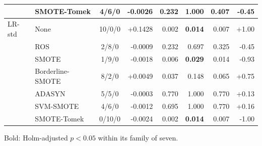\documentclass[10pt,a4paper]{article}
\begin{document}
\begin{center}
\begin{longtable}{@{}llcrrrrr@{}}
 & SMOTE-Tomek & 4/6/0 & -0.0026 & 0.232 & 1.000 & 0.407 & -0.45 \\
\midrule
LR-std & None & 10/0/0 & +0.1428 & 0.002 & \textbf{0.014} & 0.007 & +1.00 \\
 & ROS & 2/8/0 & -0.0009 & 0.232 & 0.697 & 0.325 & -0.45 \\
 & SMOTE & 1/9/0 & -0.0018 & 0.006 & \textbf{0.029} & 0.014 & -0.93 \\
 & Borderline-SMOTE & 8/2/0 & +0.0049 & 0.037 & 0.148 & 0.065 & +0.75 \\
 & ADASYN & 5/5/0 & -0.0003 & 0.770 & 1.000 & 0.770 & +0.13 \\
 & SVM-SMOTE & 4/6/0 & -0.0012 & 0.695 & 1.000 & 0.770 & +0.16 \\
 & SMOTE-Tomek & 0/10/0 & -0.0024 & 0.002 & \textbf{0.014} & 0.007 & -1.00 \\
\midrule
\bottomrule\end{longtable}\end{center}
\noindent Bold: Holm-adjusted $p<0.05$ within its family of seven.
\end{document}
